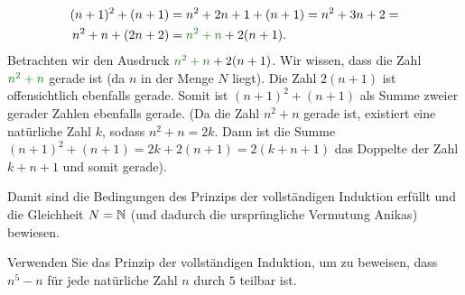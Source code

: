 \begin{myexample}
\begin{enumerate}
	      \begin{align*}
		      (n+1)^2+(n+1)  & = n^2+2n+1+(n+1) = n^2+3n+2 =        \\
		      n^2+n + (2n+2) & = \textcolor{Green}{n^2+n} + 2(n+1).
	      \end{align*}
	      Betrachten wir den Ausdruck $\textcolor{Green}{n^2+n} + 2(n+1)$. Wir wissen, dass die Zahl $\textcolor{Green}{n^2+n}$ gerade ist (da $n$ in der Menge $N$ liegt). Die Zahl $2(n+1)$ ist offensichtlich ebenfalls gerade. Somit ist $(n+1)^2+(n+1)$ als Summe zweier gerader Zahlen ebenfalls gerade. (Da die Zahl $n^2+n$ gerade ist, existiert eine natürliche Zahl $k$, sodass $n^2+n = 2k$. Dann ist die Summe $(n+1)^2+(n+1) = 2k + 2(n+1) = 2(k+n+1)$ das Doppelte der Zahl $k+n+1$ und somit gerade). \checkmark
\end{enumerate}
Damit sind die Bedingungen des Prinzips der vollständigen Induktion erfüllt und die Gleichheit $N = \mathbb{N}$ (und dadurch die ursprüngliche Vermutung Anikas) bewiesen.
\end{myexample}

\begin{myexercise}\label{myexercise:0299}
	Verwenden Sie das Prinzip der vollständigen Induktion, um zu beweisen, dass $n^5-n$ für jede natürliche Zahl $n$ durch $5$ teilbar ist.
\end{myexercise}

